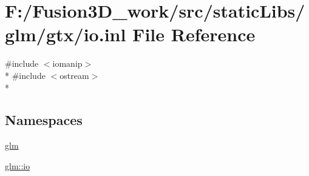 \hypertarget{io_8inl}{}\section{F\+:/\+Fusion3\+D\+\_\+work/src/static\+Libs/glm/gtx/io.inl File Reference}
\label{io_8inl}
{\ttfamily \#include $<$iomanip$>$}\\*
{\ttfamily \#include $<$ostream$>$}\\*
\subsection*{Namespaces}
\begin{DoxyCompactItemize}
\item 
 \hyperlink{namespaceglm}{glm}
\item 
 \hyperlink{namespaceglm_1_1io}{glm\+::io}
\end{DoxyCompactItemize}
